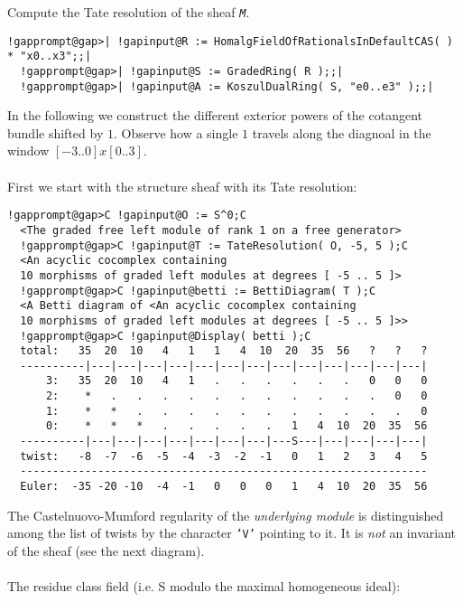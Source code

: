 \documentclass[a4paper,11pt]{report}
\begin{document}
{{{ Compute the Tate resolution of the sheaf \mbox{\texttt{\mdseries\slshape M}}. 
\begin{Verbatim}[commandchars=!@|,fontsize=\small,frame=single,label=Example]
  !gapprompt@gap>| !gapinput@R := HomalgFieldOfRationalsInDefaultCAS( ) * "x0..x3";;|
  !gapprompt@gap>| !gapinput@S := GradedRing( R );;|
  !gapprompt@gap>| !gapinput@A := KoszulDualRing( S, "e0..e3" );;|
\end{Verbatim}
 In the following we construct the different exterior powers of the cotangent
bundle shifted by $1$. Observe how a single $1$ travels along the diagnoal in the window $[ -3 .. 0 ] x [ 0 .. 3 ]$. \\
\\
 First we start with the structure sheaf with its Tate resolution: 
\begin{Verbatim}[commandchars=!@C,fontsize=\small,frame=single,label=Example]
  !gapprompt@gap>C !gapinput@O := S^0;C
  <The graded free left module of rank 1 on a free generator>
  !gapprompt@gap>C !gapinput@T := TateResolution( O, -5, 5 );C
  <An acyclic cocomplex containing
  10 morphisms of graded left modules at degrees [ -5 .. 5 ]>
  !gapprompt@gap>C !gapinput@betti := BettiDiagram( T );C
  <A Betti diagram of <An acyclic cocomplex containing 
  10 morphisms of graded left modules at degrees [ -5 .. 5 ]>>
  !gapprompt@gap>C !gapinput@Display( betti );C
  total:   35  20  10   4   1   1   4  10  20  35  56   ?   ?   ?
  ----------|---|---|---|---|---|---|---|---|---|---|---|---|---|
      3:   35  20  10   4   1   .   .   .   .   .   .   0   0   0
      2:    *   .   .   .   .   .   .   .   .   .   .   .   0   0
      1:    *   *   .   .   .   .   .   .   .   .   .   .   .   0
      0:    *   *   *   .   .   .   .   .   1   4  10  20  35  56
  ----------|---|---|---|---|---|---|---|---S---|---|---|---|---|
  twist:   -8  -7  -6  -5  -4  -3  -2  -1   0   1   2   3   4   5
  ---------------------------------------------------------------
  Euler:  -35 -20 -10  -4  -1   0   0   0   1   4  10  20  35  56
\end{Verbatim}
 The Castelnuovo-Mumford regularity of the \emph{underlying module} is distinguished among the list of twists by the character \texttt{'V'} pointing to it. It is \emph{not} an invariant of the sheaf (see the next diagram). \\
\\
 The residue class field (i.e. S modulo the maximal homogeneous ideal): 
\begin{Verbatim}[commandchars=!@|,fontsize=\small,frame=single,label=Example]

\end{Verbatim}}}}
\end{document}

